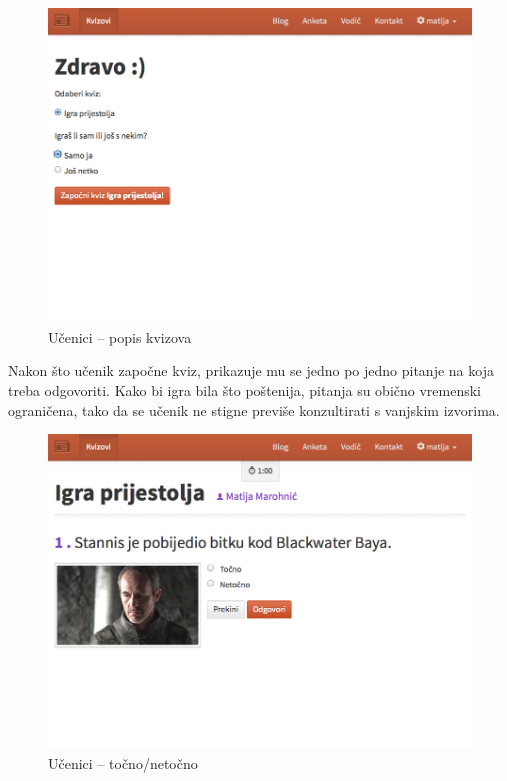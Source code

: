 \documentclass{scrreprt}
\begin{document}
\begin{figure}[H]
  \includegraphics[width=\textwidth, clip=true, trim=0 8.5cm 0 0, fbox]{student/quizzes}
  \caption{Učenici -- popis kvizova}
\end{figure}

Nakon što učenik započne kviz, prikazuje mu se jedno po jedno pitanje na koja
treba odgovoriti. Kako bi igra bila što poštenija, pitanja su obično vremenski
ograničena, tako da se učenik ne stigne previše konzultirati s vanjskim
izvorima.

\begin{figure}[H]
  \includegraphics[width=\textwidth, clip=true, trim=0 7cm 0 0, fbox]{student/boolean_question}
  \caption{Učenici -- točno/netočno}
\end{figure}
\end{document}
